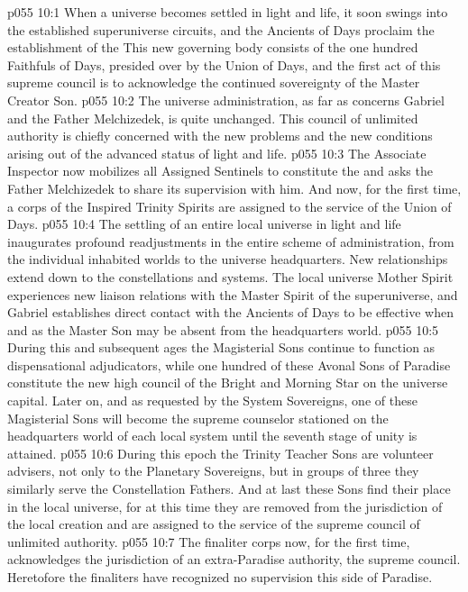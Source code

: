 \vs p055 10:1 When a universe becomes settled in light and life, it soon swings into the established superuniverse circuits, and the Ancients of Days proclaim the establishment of the  This new governing body consists of the one hundred Faithfuls of Days, presided over by the Union of Days, and the first act of this supreme council is to acknowledge the continued sovereignty of the Master Creator Son.
\vs p055 10:2 The universe administration, as far as concerns Gabriel and the Father Melchizedek, is quite unchanged. This council of unlimited authority is chiefly concerned with the new problems and the new conditions arising out of the advanced status of light and life.
\pc \vs p055 10:3 The Associate Inspector now mobilizes all Assigned Sentinels to constitute the  and asks the Father Melchizedek to share its supervision with him. And now, for the first time, a corps of the Inspired Trinity Spirits are assigned to the service of the Union of Days.
\pc \vs p055 10:4 The settling of an entire local universe in light and life inaugurates profound readjustments in the entire scheme of administration, from the individual inhabited worlds to the universe headquarters. New relationships extend down to the constellations and systems. The local universe Mother Spirit experiences new liaison relations with the Master Spirit of the superuniverse, and Gabriel establishes direct contact with the Ancients of Days to be effective when and as the Master Son may be absent from the headquarters world.
\vs p055 10:5 During this and subsequent ages the Magisterial Sons continue to function as dispensational adjudicators, while one hundred of these Avonal Sons of Paradise constitute the new high council of the Bright and Morning Star on the universe capital. Later on, and as requested by the System Sovereigns, one of these Magisterial Sons will become the supreme counselor stationed on the headquarters world of each local system until the seventh stage of unity is attained.
\vs p055 10:6 During this epoch the Trinity Teacher Sons are volunteer advisers, not only to the Planetary Sovereigns, but in groups of three they similarly serve the Constellation Fathers. And at last these Sons find their place in the local universe, for at this time they are removed from the jurisdiction of the local creation and are assigned to the service of the supreme council of unlimited authority.
\pc \vs p055 10:7 The finaliter corps now, for the first time, acknowledges the jurisdiction of an extra\hyp{}Paradise authority, the supreme council. Heretofore the finaliters have recognized no supervision this side of Paradise.
